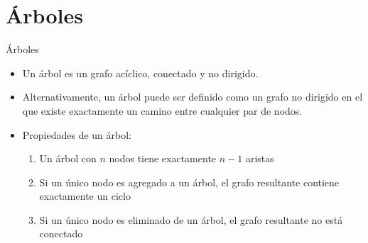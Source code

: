 \documentclass[]{beamer}
\begin{document}
\section{\'Arboles}
\begin{frame}{\'Arboles}
  \begin{itemize}
    \item Un \'arbol es un grafo ac\'iclico, conectado y no dirigido.
      \pause
    \item Alternativamente, un \'arbol puede ser definido como un grafo no dirigido en el que existe exactamente un camino entre cualquier par de nodos.
      \pause
    \item Propiedades de un \'arbol: 
      \begin{enumerate}
        \item Un \'arbol con $n$ nodos tiene exactamente $n-1$ aristas
          \pause
        \item Si un \'unico nodo es agregado a un \'arbol, el grafo resultante contiene exactamente un ciclo
          \pause
        \item Si un \'unico nodo es eliminado de un \'arbol, el grafo resultante no est\'a conectado
      \end{enumerate}
  \end{itemize}
\end{frame}
\end{document}
